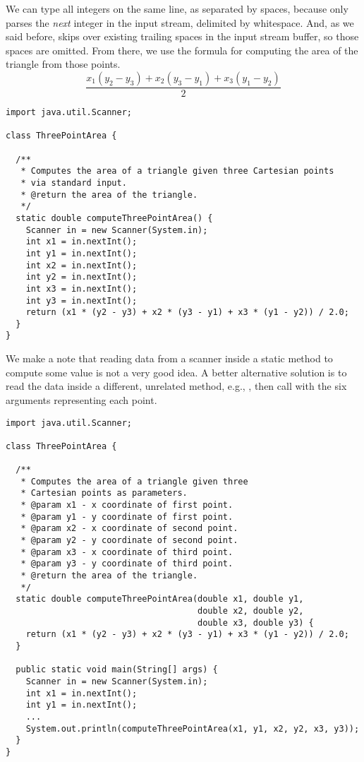 We can type all integers on the same line, as separated by spaces, because  only parses the \emph{next} integer in the input stream, delimited by whitespace. 
And, as we said before,  skips over existing trailing spaces in the input stream buffer, so those spaces are omitted. 
From there, we use the formula for computing the area of the triangle from those points.
\[
\dfrac{x_1(y_2 - y_3) + x_2(y_3 - y_1) + x_3 (y_1 - y_2)}{2}
\]
\begin{lstlisting}[language=MyJava]
import java.util.Scanner;

class ThreePointArea {

  /**
   * Computes the area of a triangle given three Cartesian points 
   * via standard input.
   * @return the area of the triangle.
   */
  static double computeThreePointArea() {
    Scanner in = new Scanner(System.in);
    int x1 = in.nextInt();
    int y1 = in.nextInt();
    int x2 = in.nextInt();
    int y2 = in.nextInt();
    int x3 = in.nextInt();
    int y3 = in.nextInt();
    return (x1 * (y2 - y3) + x2 * (y3 - y1) + x3 * (y1 - y2)) / 2.0;
  }
}
\end{lstlisting}

We make a note that reading data from a scanner inside a static method to compute some value is not a very good idea. 
A better alternative solution is to read the data inside a different, unrelated method, e.g., , then call  with the six arguments representing each point.

\begin{lstlisting}[language=MyJava]
import java.util.Scanner;

class ThreePointArea {
  
  /**
   * Computes the area of a triangle given three 
   * Cartesian points as parameters.
   * @param x1 - x coordinate of first point.
   * @param y1 - y coordinate of first point.
   * @param x2 - x coordinate of second point.
   * @param y2 - y coordinate of second point.
   * @param x3 - x coordinate of third point.
   * @param y3 - y coordinate of third point.
   * @return the area of the triangle.
   */
  static double computeThreePointArea(double x1, double y1,
                                      double x2, double y2,
                                      double x3, double y3) {
    return (x1 * (y2 - y3) + x2 * (y3 - y1) + x3 * (y1 - y2)) / 2.0;
  }

  public static void main(String[] args) {
    Scanner in = new Scanner(System.in);
    int x1 = in.nextInt();
    int y1 = in.nextInt();
    ...
    System.out.println(computeThreePointArea(x1, y1, x2, y2, x3, y3));
  }
}
\end{lstlisting}

